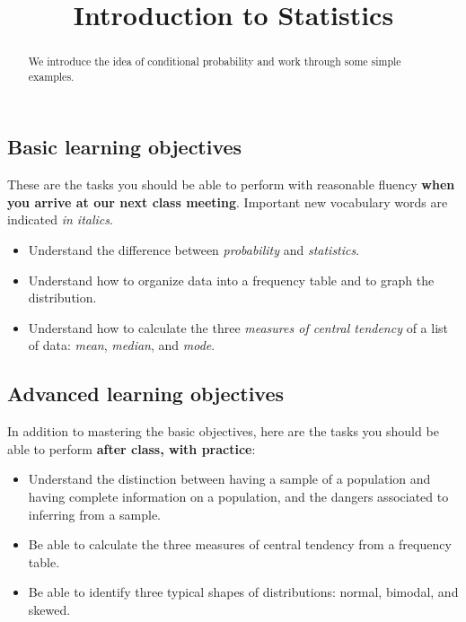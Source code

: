 \documentclass{ximera}
\title{Introduction to Statistics}
\begin{document}
\begin{abstract}
We introduce the idea of conditional probability and work through some simple examples.
\end{abstract}
\maketitle

\subsection*{Basic learning objectives}

These are the tasks you should be able to perform with reasonable fluency \textbf{when you arrive at our next class meeting}. Important new vocabulary words are indicated \emph{in italics}. 

\begin{itemize}
    \item Understand the difference between \emph{probability} and \emph{statistics}.
    \item Understand how to organize data into a frequency table and to graph the distribution.
	\item Understand how to calculate the three \emph{measures of central tendency} of a list of data: \emph{mean}, \emph{median}, and \emph{mode}.
\end{itemize}

\subsection*{Advanced learning objectives}

In addition to mastering the basic objectives, here are the tasks you should be able to perform \textbf{after class, with practice}: 

\begin{itemize}
	\item Understand the distinction between having a sample of a population and having complete information on a population, and the dangers associated to inferring from a sample.
	\item Be able to calculate the three measures of central tendency from a frequency table.
    \item Be able to identify three typical shapes of distributions: normal, bimodal, and skewed.
\end{itemize}

\noindent\hrulefill
\end{document}
